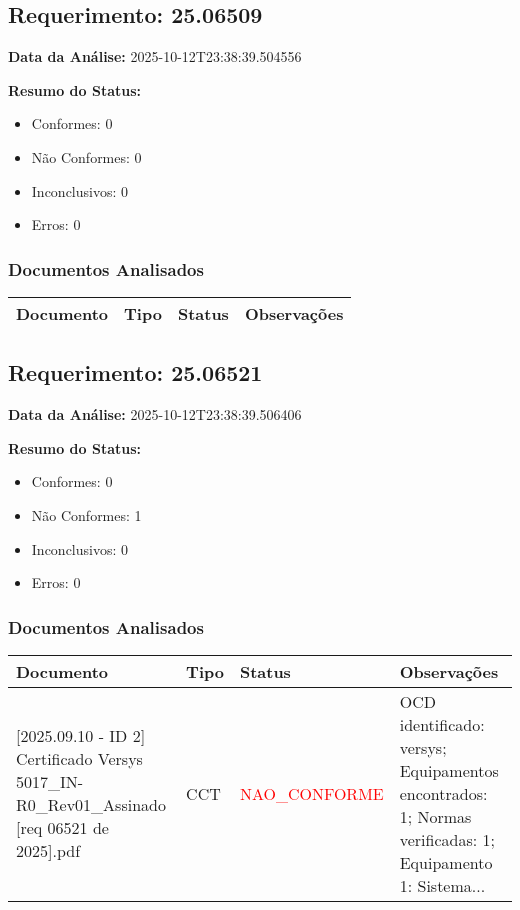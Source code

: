 \documentclass[12pt,a4paper]{article}
\begin{document}
\subsection{Requerimento: 25.06509}

\textbf{Data da Análise:} 2025-10-12T23:38:39.504556

\textbf{Resumo do Status:}
\begin{itemize}
    \item Conformes: 0
    \item Não Conformes: 0
    \item Inconclusivos: 0
    \item Erros: 0
\end{itemize}

\subsubsection{Documentos Analisados}

\begin{longtable}{|p{4cm}|p{2cm}|p{2cm}|p{6cm}|}
\hline
\textbf{Documento} & \textbf{Tipo} & \textbf{Status} & \textbf{Observações} \\
\hline
\endhead
\end{longtable}


\subsection{Requerimento: 25.06521}

\textbf{Data da Análise:} 2025-10-12T23:38:39.506406

\textbf{Resumo do Status:}
\begin{itemize}
    \item Conformes: 0
    \item Não Conformes: 1
    \item Inconclusivos: 0
    \item Erros: 0
\end{itemize}

\subsubsection{Documentos Analisados}

\begin{longtable}{|p{4cm}|p{2cm}|p{2cm}|p{6cm}|}
\hline
\textbf{Documento} & \textbf{Tipo} & \textbf{Status} & \textbf{Observações} \\
\hline
\endhead
[Certificado de Conformidade Técnica - CCT][2025.09.10 - ID 2] Certificado Versys 5017\_IN-R0\_Rev01\_Assinado [req 06521 de 2025].pdf & CCT & \textcolor{red}{NAO\_CONFORME} & OCD identificado: versys; Equipamentos encontrados: 1; Normas verificadas: 1; Equipamento 1: Sistema... \\
\hline
\end{longtable}
\end{document}

